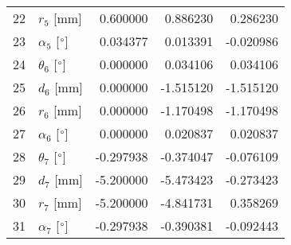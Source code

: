 \documentclass{standalone}%
\begin{document}
\begin{tabular}{llrrr}
22 &              $r_{5}$ [mm] &   0.600000 &   0.886230 &   0.286230 \\
23 &  $\alpha_{5}$ [$\degree$] &   0.034377 &   0.013391 &  -0.020986 \\
24 &  $\theta_{6}$ [$\degree$] &   0.000000 &   0.034106 &   0.034106 \\
25 &              $d_{6}$ [mm] &   0.000000 &  -1.515120 &  -1.515120 \\
26 &              $r_{6}$ [mm] &   0.000000 &  -1.170498 &  -1.170498 \\
27 &  $\alpha_{6}$ [$\degree$] &   0.000000 &   0.020837 &   0.020837 \\
28 &  $\theta_{7}$ [$\degree$] &  -0.297938 &  -0.374047 &  -0.076109 \\
29 &              $d_{7}$ [mm] &  -5.200000 &  -5.473423 &  -0.273423 \\
30 &              $r_{7}$ [mm] &  -5.200000 &  -4.841731 &   0.358269 \\
31 &  $\alpha_{7}$ [$\degree$] &  -0.297938 &  -0.390381 &  -0.092443 \\
\bottomrule
\end{tabular}
%
\end{document}
